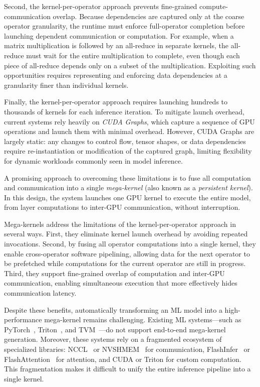 Second, the kernel-per-operator approach prevents fine-grained compute-communication overlap. Because dependencies are captured only at the coarse operator granularity, the runtime must enforce full-operator completion before launching dependent communication or computation.
For example, when a matrix multiplication is followed by an all-reduce in separate kernels, the all-reduce must wait for the entire multiplication to complete, even though each piece of all-reduce depends only on a subset of the multiplication. Exploiting such opportunities requires representing and enforcing data dependencies at a granularity finer than individual kernels.

Finally, the kernel-per-operator approach requires launching hundreds to thousands of kernels for each inference iteration. To mitigate launch overhead, current systems rely heavily on {\em CUDA Graphs}, which capture a sequence of GPU operations and launch them with minimal overhead. However, CUDA Graphs are largely static: any changes to control flow, tensor shapes, or data dependencies require re-instantiation or modification of the captured graph, limiting flexibility for dynamic workloads commonly seen in model inference.
%

A promising approach to overcoming these limitations is to fuse all computation and communication into a single {\em mega-kernel} (also known as a {\em persistent kernel}).
In this design, the system launches one GPU kernel to execute the entire model, from layer computations to inter-GPU communication, without interruption.
%

Mega-kernels address the limitations of the kernel-per-operator approach in several ways.
First, they eliminate kernel launch overhead by avoiding repeated invocations. 
Second, by fusing all operator computations into a single kernel, they enable cross-operator software pipelining, allowing data for the next operator to be prefetched while computations for the current operator are still in progress. Third, they support fine-grained overlap of computation and inter-GPU communication, enabling simultaneous execution that more effectively hides communication latency.

Despite these benefits, automatically transforming an ML model into a high-performance mega-kernel remains challenging. Existing ML systems---such as PyTorch~\cite{pytorch}, Triton~\cite{tillet2019triton}, and TVM~\cite{tvm}---do not support end-to-end mega-kernel generation. Moreover, these systems rely on a fragmented ecosystem of specialized libraries: NCCL~\cite{nccl} or NVSHMEM~\cite{nvshmem} for communication, FlashInfer~\cite{ye2025flashinfer} or FlashAttention~\cite{dao2023flash} for attention, and CUDA or Triton for custom computation. This fragmentation makes it difficult to unify the entire inference pipeline into a single kernel.

